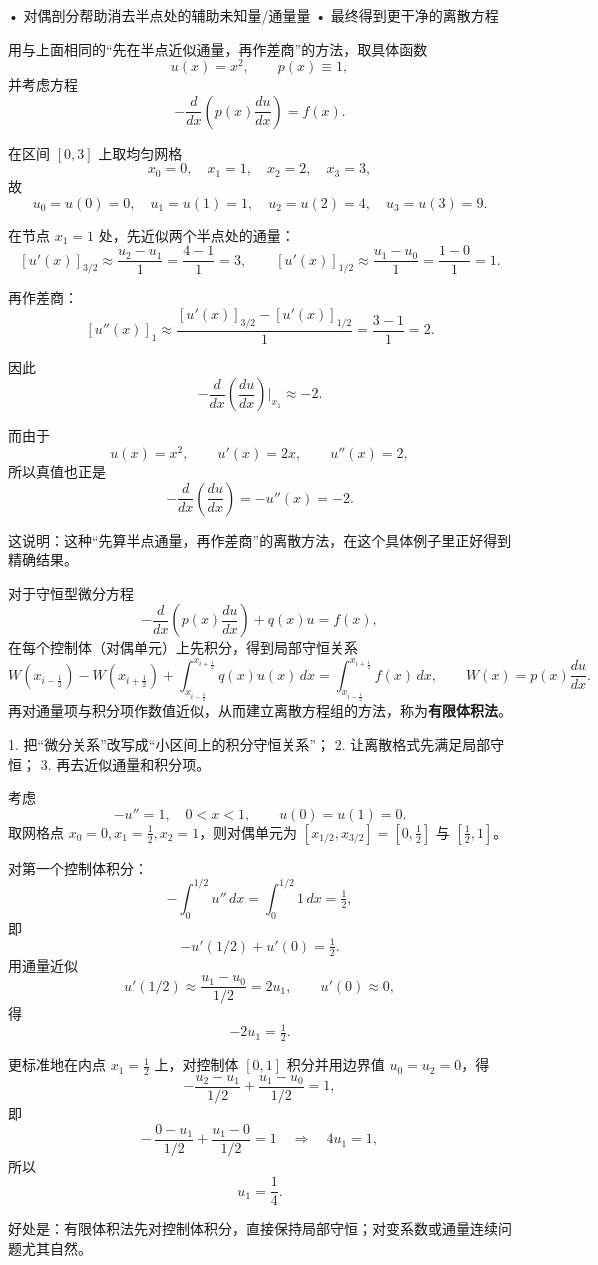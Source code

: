 \begin{dxtips}
    	•	对偶剖分帮助消去半点处的辅助未知量/通量量
	•	最终得到更干净的离散方程
\end{dxtips}
\begin{example}
用与上面相同的“先在半点近似通量，再作差商”的方法，取具体函数
\[
u(x)=x^2,
\qquad p(x)\equiv 1,
\]
并考虑方程
\[
-\frac{d}{dx}\!\left(p(x)\frac{du}{dx}\right)=f(x).
\]

在区间 \([0,3]\) 上取均匀网格
\[
x_0=0,\quad x_1=1,\quad x_2=2,\quad x_3=3,
\]
故
\[
u_0=u(0)=0,\quad u_1=u(1)=1,\quad u_2=u(2)=4,\quad u_3=u(3)=9.
\]

在节点 \(x_1=1\) 处，先近似两个半点处的通量：
\[
\left[u'(x)\right]_{3/2}\approx \frac{u_2-u_1}{1}=\frac{4-1}{1}=3,
\qquad
\left[u'(x)\right]_{1/2}\approx \frac{u_1-u_0}{1}=\frac{1-0}{1}=1.
\]

再作差商：
\[
\left[u''(x)\right]_1\approx
\frac{\left[u'(x)\right]_{3/2}-\left[u'(x)\right]_{1/2}}{1}
=\frac{3-1}{1}=2.
\]

因此
\[
-\frac{d}{dx}\!\left(\frac{du}{dx}\right)\Big|_{x_1}
\approx -2.
\]

而由于
\[
u(x)=x^2,\qquad u'(x)=2x,\qquad u''(x)=2,
\]
所以真值也正是
\[
-\frac{d}{dx}\!\left(\frac{du}{dx}\right)=-u''(x)=-2.
\]

这说明：这种“先算半点通量，再作差商”的离散方法，在这个具体例子里正好得到精确结果。
\end{example}
\begin{definition}[有限体积法]
对于守恒型微分方程
\[
-\frac{d}{dx}\!\left(p(x)\frac{du}{dx}\right)+q(x)u=f(x),
\]
在每个控制体（对偶单元）上先积分，得到局部守恒关系
\[
W(x_{i-\frac12})-W(x_{i+\frac12})+\int_{x_{i-\frac12}}^{x_{i+\frac12}} q(x)u(x)\,dx
=
\int_{x_{i-\frac12}}^{x_{i+\frac12}} f(x)\,dx,
\qquad
W(x)=p(x)\frac{du}{dx}.
\]
再对通量项与积分项作数值近似，从而建立离散方程组的方法，称为\textbf{有限体积法}。
\end{definition}
\begin{dxtips}
    1.	把“微分关系”改写成“小区间上的积分守恒关系”；
	2.	让离散格式先满足局部守恒；
	3.	再去近似通量和积分项。
\end{dxtips}
\begin{example}
考虑
\[
-u''=1,\quad 0<x<1,\qquad u(0)=u(1)=0.
\]
取网格点 \(x_0=0,x_1=\tfrac12,x_2=1\)，则对偶单元为 \([x_{1/2},x_{3/2}]=[0,\tfrac12]\) 与 \([\tfrac12,1]\)。

对第一个控制体积分：
\[
-\int_0^{1/2}u''\,dx=\int_0^{1/2}1\,dx=\tfrac12,
\]
即
\[
-u'(1/2)+u'(0)=\tfrac12.
\]
用通量近似
\[
u'(1/2)\approx \frac{u_1-u_0}{1/2}=2u_1,\qquad
u'(0)\approx 0,
\]
得
\[
-2u_1=\tfrac12.
\]

更标准地在内点 \(x_1=\tfrac12\) 上，对控制体 \([0,1]\) 积分并用边界值 \(u_0=u_2=0\)，得
\[
-\frac{u_2-u_1}{1/2}+\frac{u_1-u_0}{1/2}=1,
\]
即
\[
-\,\frac{0-u_1}{1/2}+\frac{u_1-0}{1/2}=1
\quad\Longrightarrow\quad
4u_1=1,
\]
所以
\[
u_1=\frac14.
\]

好处是：有限体积法先对控制体积分，直接保持局部守恒；对变系数或通量连续问题尤其自然。
\end{example}
